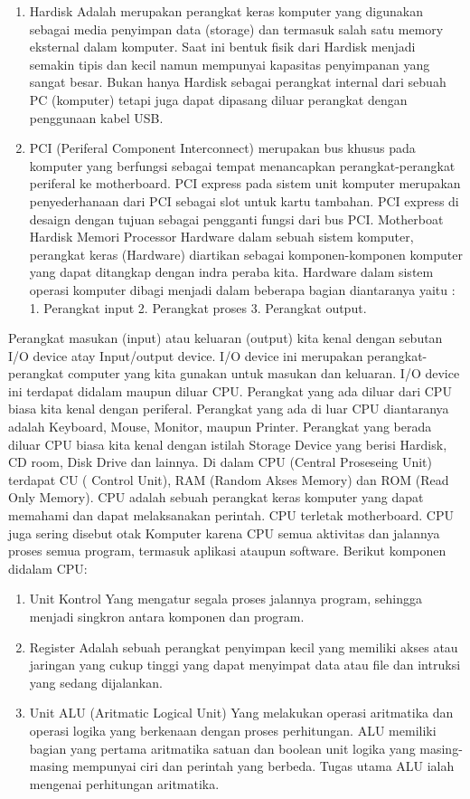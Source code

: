 \begin{enumerate}
\item Hardisk Adalah merupakan perangkat keras komputer yang digunakan sebagai media penyimpan data (storage) dan termasuk salah satu memory eksternal dalam komputer. Saat ini bentuk fisik dari Hardisk menjadi semakin tipis dan kecil namun mempunyai kapasitas penyimpanan yang sangat besar. Bukan hanya Hardisk sebagai perangkat internal dari sebuah PC (komputer) tetapi juga dapat dipasang diluar perangkat dengan penggunaan kabel USB.
\item PCI (Periferal Component Interconnect) merupakan bus khusus pada komputer yang berfungsi sebagai tempat menancapkan perangkat-perangkat periferal ke motherboard. PCI express pada sistem unit komputer merupakan penyederhanaan dari PCI sebagai slot untuk kartu tambahan. PCI express di desaign dengan tujuan sebagai pengganti fungsi dari bus PCI. Motherboat Hardisk Memori Processor Hardware dalam sebuah sistem komputer, perangkat keras (Hardware) diartikan sebagai komponen-komponen komputer yang dapat ditangkap dengan indra peraba kita. Hardware dalam sistem operasi komputer dibagi menjadi dalam beberapa bagian diantaranya yaitu : 
1.	Perangkat input
2.	Perangkat proses
3.	Perangkat output.
\end{enumerate}
Perangkat masukan (input) atau keluaran (output) kita kenal dengan sebutan I/O device atay Input/output device. I/O device ini merupakan perangkat-perangkat computer yang kita gunakan untuk masukan dan keluaran. I/O device ini terdapat didalam maupun diluar CPU. Perangkat yang ada diluar dari CPU biasa kita kenal dengan periferal. Perangkat yang ada di luar CPU diantaranya adalah Keyboard, Mouse, Monitor, maupun Printer. Perangkat yang berada diluar CPU biasa kita kenal dengan istilah Storage Device yang berisi Hardisk, CD room, Disk Drive dan lainnya.  
Di dalam CPU (Central Proseseing Unit) terdapat CU ( Control Unit), RAM (Random Akses Memory) dan ROM (Read Only Memory). CPU adalah sebuah perangkat keras komputer yang dapat memahami dan dapat melaksanakan perintah. CPU terletak motherboard. CPU juga sering disebut otak Komputer karena CPU semua aktivitas dan jalannya proses semua program, termasuk aplikasi ataupun software.  Berikut komponen didalam CPU:
\begin{enumerate}
\item Unit Kontrol
Yang mengatur segala proses jalannya program, sehingga menjadi singkron antara komponen dan program.
\item Register
Adalah sebuah perangkat penyimpan kecil yang memiliki akses atau jaringan yang cukup tinggi yang dapat menyimpat data atau file dan intruksi yang sedang dijalankan.
\item Unit ALU (Aritmatic Logical Unit)
Yang melakukan operasi aritmatika dan operasi logika yang berkenaan dengan proses perhitungan. ALU memiliki bagian yang pertama aritmatika satuan dan boolean unit logika yang masing-masing mempunyai ciri dan perintah yang berbeda. Tugas utama ALU ialah mengenai perhitungan aritmatika.
\end{enumerate}

